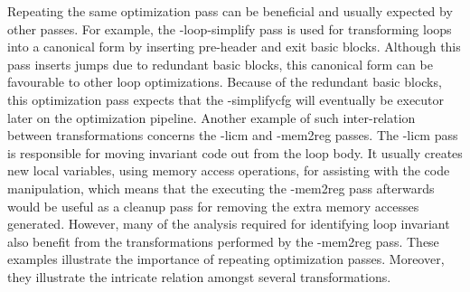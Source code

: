 
Repeating the same optimization pass can be beneficial and usually expected by other passes.
For example, the {\flagstype -loop-simplify} pass is used for transforming loops into a canonical form by inserting pre-header and exit basic blocks.
Although this pass inserts jumps due to redundant basic blocks, this canonical form can be favourable to other loop optimizations.
Because of the redundant basic blocks, this optimization pass expects that the {\flagstype -simplifycfg} will eventually be executor later on the optimization pipeline.
Another example of such inter-relation between transformations concerns the {\flagstype -licm} and {\flagstype -mem2reg} passes.
The {\flagstype -licm} pass is responsible for moving invariant code out from the loop body.
It usually creates new local variables, using memory access operations, for assisting with the code manipulation, which means that the executing the {\flagstype -mem2reg} pass afterwards would be useful as a cleanup pass for removing the extra memory accesses generated.
However, many of the analysis required for identifying loop invariant also benefit from the transformations performed by the {\flagstype -mem2reg} pass.
These examples illustrate the importance of repeating optimization passes.
Moreover, they illustrate the intricate relation amongst several transformations.

